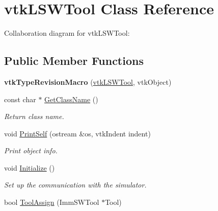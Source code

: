 \hypertarget{classvtkLSWTool}{
\section{vtkLSWTool Class Reference}
\label{classvtkLSWTool}
}


Collaboration diagram for vtkLSWTool:\subsection*{Public Member Functions}
\begin{DoxyCompactItemize}
\item 
\hypertarget{classvtkLSWTool_a241c593d9b4c2726a7a726b25072dd56}{
{\bfseries vtkTypeRevisionMacro} (\hyperlink{classvtkLSWTool}{vtkLSWTool}, vtkObject)}
\label{classvtkLSWTool_a241c593d9b4c2726a7a726b25072dd56}

\item 
\hypertarget{classvtkLSWTool_afab41086fa44ac93e499e53a22c29162}{
const char $\ast$ \hyperlink{classvtkLSWTool_afab41086fa44ac93e499e53a22c29162}{GetClassName} ()}
\label{classvtkLSWTool_afab41086fa44ac93e499e53a22c29162}

\begin{DoxyCompactList}\small\item\em Return class name. \item\end{DoxyCompactList}\item 
\hypertarget{classvtkLSWTool_a95800852b3a3b524969977fa8701bb49}{
void \hyperlink{classvtkLSWTool_a95800852b3a3b524969977fa8701bb49}{PrintSelf} (ostream \&os, vtkIndent indent)}
\label{classvtkLSWTool_a95800852b3a3b524969977fa8701bb49}

\begin{DoxyCompactList}\small\item\em Print object info. \item\end{DoxyCompactList}\item 
\hypertarget{classvtkLSWTool_ac0e55b5f343ed54e7f8df04740ad6600}{
void \hyperlink{classvtkLSWTool_ac0e55b5f343ed54e7f8df04740ad6600}{Initialize} ()}
\label{classvtkLSWTool_ac0e55b5f343ed54e7f8df04740ad6600}

\begin{DoxyCompactList}\small\item\em Set up the communication with the simulator. \item\end{DoxyCompactList}\item 
\hypertarget{classvtkLSWTool_ac361f9c3adbf02cfe98f648f52ee04df}{
bool \hyperlink{classvtkLSWTool_ac361f9c3adbf02cfe98f648f52ee04df}{ToolAssign} (ImmSWTool $\ast$Tool)}
\label{classvtkLSWTool_ac361f9c3adbf02cfe98f648f52ee04df}


\end{DoxyCompactItemize}
